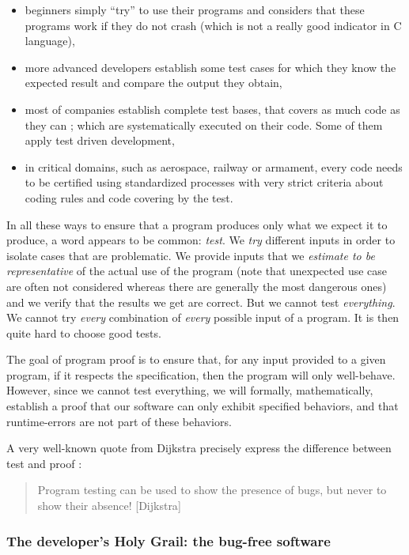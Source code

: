 \documentclass[12pt,francais,]{scrbook}
\providecommand{\tightlist}{%
  \setlength{\itemsep}{0pt}\setlength{\parskip}{0pt}}
\begin{document}
\begin{itemize}
\tightlist
\item
  beginners simply ``try'' to use their programs and considers that
  these programs work if they do not crash (which is not a really good
  indicator in C language),
\item
  more advanced developers establish some test cases for which they know
  the expected result and compare the output they obtain,
\item
  most of companies establish complete test bases, that covers as much
  code as they can ; which are systematically executed on their code.
  Some of them apply test driven development,
\item
  in critical domains, such as aerospace, railway or armament, every
  code needs to be certified using standardized processes with very
  strict criteria about coding rules and code covering by the test.
\end{itemize}

In all these ways to ensure that a program produces only what we expect
it to produce, a word appears to be common: \emph{test}. We \emph{try}
different inputs in order to isolate cases that are problematic. We
provide inputs that we \emph{estimate to be representative} of the
actual use of the program (note that unexpected use case are often not
considered whereas there are generally the most dangerous ones) and we
verify that the results we get are correct. But we cannot test
\emph{everything}. We cannot try \emph{every} combination of
\emph{every} possible input of a program. It is then quite hard to
choose good tests.

The goal of program proof is to ensure that, for any input provided to a
given program, if it respects the specification, then the program will
only well-behave. However, since we cannot test everything, we will
formally, mathematically, establish a proof that our software can only
exhibit specified behaviors, and that runtime-errors are not part of
these behaviors.

A very well-known quote from Dijkstra precisely express the difference
between test and proof :

\begin{quote}
Program testing can be used to show the presence of bugs, but never to
show their absence! \hfill {[}Dijkstra{]}
\end{quote}

\subsubsection{The developer's Holy Grail: the bug-free
software}\label{the-developers-holy-grail-the-bug-free-software}
\end{document}
